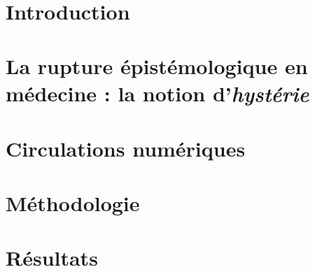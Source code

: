 \documentclass[a4paper]{report}
\begin{document}
\newcommand{\HRule}{\rule{\linewidth}{0.5mm}}


\newpage
~
\thispagestyle{empty}
\newpage
\setcounter{page}{0}

\thispagestyle{empty}
\setcounter{page}{0}
\newpage
~
\thispagestyle{empty}
\setcounter{page}{0}

\newpage


\thispagestyle{empty}
\setcounter{page}{0}
\newpage
~
\thispagestyle{empty}
\setcounter{page}{0}

\newpage

\tableofcontents
\thispagestyle{empty}
\setcounter{page}{0}

\newpage

\renewcommand{\arraystretch}{1.5}


~
\thispagestyle{empty}
\setcounter{page}{0}
\newpage



\chapter{Introduction}

\chapter{La rupture épistémologique en médecine : la notion d'\textit{hystérie}}


\chapter{Circulations numériques}


\chapter{Méthodologie}


\chapter{Résultats}

\end{document}
